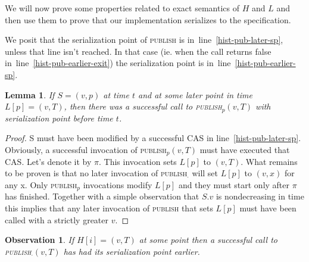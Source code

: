 \documentclass[a4paper,11pt]{article}
\newtheorem{lemma}{Lemma}
\newtheorem{observation}{Observation}
\newcommand{\fn}[1]{\textsc{#1}}
\begin{document}
We will now prove some properties related to exact semantics of $H$ and $L$ and then use them to prove that our implementation serializes to the specification.



We posit that the serialization point of \fn{publish} is in~line~\ref{hist-pub-later-sp}, unless that line isn't reached. In that case (ie. when the call returns false in~line~\ref{hist-pub-earlier-exit})
the serialization point is in~line~\ref{hist-pub-earlier-sp}.


\begin{lemma}\label{hist-cv-latest}
If $S = (v, p)$ at time $t$ and at some later point in time $L[p] = (v, T)$, then there was a successful call to \fn{publish$_p$}$(v, T)$ with serialization point before time $t$.
\end{lemma}
\begin{proof}
S must have been modified by a successful CAS in line~\ref{hist-pub-later-sp}. Obviously, a successful invocation of \fn{publish$_p$}$(v, T)$ must have executed that CAS. Let's denote it by $\pi$.
This invocation sets $L[p]$ to $(v, T)$. What remains to be proven is that no later invocation of \fn{publish$_\cdot$} will set $L[p]$ to $(v, x)$ for any x.
Only \fn{publish$_p$} invocations modify $L[p]$ and they must start only after $\pi$ has finished. Together with a simple observation that $S.v$ is nondecreasing in time this implies
that any later invocation of \fn{publish} that sets $L[p]$ must have been called with a strictly greater $v$.
\end{proof}

\begin{observation}
\label{obs-hist-is-correct}
If $H[i] = (v, T)$ at some point then a successful call to \fn{publish$_\cdot$}$(v, T)$ has had its serialization point earlier.
\end{observation}
\end{document}
